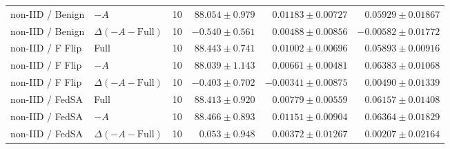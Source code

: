 \begin{table}[t]
\begin{tabular}{llrrrr}
non-IID / Benign & $-A$ & 10 & $88.054 \pm 0.979$ & $0.01183 \pm 0.00727$ & $0.05929 \pm 0.01867$ \\
non-IID / Benign & $\Delta(-A-\mathrm{Full})$ & 10 & $-0.540 \pm 0.561$ & $0.00488 \pm 0.00856$ & $-0.00582 \pm 0.01772$ \\
non-IID / F Flip & Full & 10 & $88.443 \pm 0.741$ & $0.01002 \pm 0.00696$ & $0.05893 \pm 0.00916$ \\
non-IID / F Flip & $-A$ & 10 & $88.039 \pm 1.143$ & $0.00661 \pm 0.00481$ & $0.06383 \pm 0.01068$ \\
non-IID / F Flip & $\Delta(-A-\mathrm{Full})$ & 10 & $-0.403 \pm 0.702$ & $-0.00341 \pm 0.00875$ & $0.00490 \pm 0.01339$ \\
non-IID / FedSA & Full & 10 & $88.413 \pm 0.920$ & $0.00779 \pm 0.00559$ & $0.06157 \pm 0.01408$ \\
non-IID / FedSA & $-A$ & 10 & $88.466 \pm 0.893$ & $0.01151 \pm 0.00904$ & $0.06364 \pm 0.01829$ \\
non-IID / FedSA & $\Delta(-A-\mathrm{Full})$ & 10 & $0.053 \pm 0.948$ & $0.00372 \pm 0.01267$ & $0.00207 \pm 0.02164$ \\
\bottomrule
\end{tabular}
\end{table}

